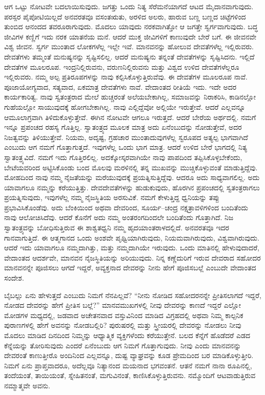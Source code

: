 ಆಗ ಒಟ್ಟು ನೋಟವೇ ಬದಲಾಯಿಸುವುದು. ಜಗತ್ತು ಒಂದು ನಿತ್ಯ ಸೆರೆಮನೆಯಾಗದೆ ಆಟದ ಮೈದಾನವಾಗುವುದು. ಪರಸ್ಪರ ಪೈಪೋಟಿಯಿಲ್ಲದೆ ಅನವರತವೂ ವಸಂತಋತು, ಅರಳಿದ ಅಲರು, ಹಾರುವ ಬಣ್ಣ ಬಣ್ಣದ ಚಿಟ್ಟೆಗಳಿಂದ ತುಂಬಿದ ಆನಂದದ ತವರೂರಾಗುವುದು. ಮೊದಲು ಯಾವುದು ನರಕವಾಗಿತ್ತೋ ಆ ಜಗತ್ತೇ ಸ್ವರ್ಗವಾಗುವುದು. ಬದ್ಧ ಜೀವಿಗಳ ಕಣ್ಣಿಗೆ ಇದು ನರಕ ಯಾತನೆಯ ಮನೆ. ಆದರೆ ಮುಕ್ತ ಜೀವಿಗಳಿಗೆ ಕಾಣುವುದೇ ಬೇರೆ ಬಗೆ. ಈ ಜೀವನವೇ ವಿಶ್ವ ಜೀವನ. ಸ್ವರ್ಗ ಮುಂತಾದ ಲೋಕಗಳೆಲ್ಲ ಇಲ್ಲೇ ಇವೆ. ಮಾನವನನ್ನು ಹೋಲುವ ದೇವತೆಗಳೆಲ್ಲ ಇಲ್ಲಿರುವರು. ದೇವತೆಗಳು ತಮ್ಮಂತೆ ಮನುಷ್ಯನನ್ನು ಸೃಷ್ಟಿಸಲಿಲ್ಲ. ಆದರೆ ಮನುಷ್ಯನು ತನ್ನಂತೆ ದೇವತೆಗಳನ್ನು ಸೃಷ್ಟಿಸಿದನು. ಇಲ್ಲಿದೆ ದೇವತೆಗಳ ಮೂಲರೂಪ. ಇಂದ್ರನಿಲ್ಲಿರುವನು, ವರುಣನಿಲ್ಲಿರುವನು ಮತ್ತು ವಿಶ್ವದ ಉಳಿದ ದೇವತೆಗಳೆಲ್ಲರೂ ಇಲ್ಲಿರುವರು. ನಮ್ಮ ಅಲ್ಪ ಪ್ರತಿರೂಪಗಳನ್ನು ನಾವು ಕಲ್ಪಿಸಿಕೊಳ್ಳುತ್ತಿರುವೆವು. ಈ ದೇವತೆಗಳ ಮೂಲರೂಪ ನಾವೆ. ಪೂಜಾಯೋಗ್ಯವಾದ, ಸತ್ಯವಾದ, ಏಕಮಾತ್ರ ದೇವತೆಗಳು ನಾವೆ. ವೇದಾಂತದ ರೀತಿಯೆ ಇದು. ಇದೇ ಅದರ ಕಾರ್ಯಕಾರಿತ್ವ. ನಾವು ಸ್ವತಂತ್ರರಾದ ಮೇಲೆ ಹುಚ್ಚರಂತೆ ಅಲೆಯಬೇಕಾಗಿಲ್ಲ, ಸಮಾಜವನ್ನು ನಿರಾಕರಿಸಿ, ಕಾಡಿನಲ್ಲೋ ಗುಹೆಯಲ್ಲೋ ಸಾಯುವುದಕ್ಕೆ ಹೋಗಬೇಕಾಗಿಲ್ಲ. ನಾವು ಎಲ್ಲಿದ್ದೆವೋ ಅಲ್ಲಿಯೇ ಇರುತ್ತೇವೆ. ಆದರೆ ಎಲ್ಲವನ್ನೂ ಆಮೂಲಾಗ್ರವಾಗಿ ತಿಳಿದುಕೊಳ್ಳುತ್ತೇವೆ. ಈಗಿನ ನೋಟವೇ ಆಗಲೂ ಇರುತ್ತದೆ. ಆದರೆ ಬೇರೆಯ ಅರ್ಥದಲ್ಲಿ. ನಮಗೆ ಇನ್ನೂ ಪ್ರಪಂಚದ ರಹಸ್ಯ ಗೊತ್ತಿಲ್ಲ. ಸ್ವಾತಂತ್ರ್ಯದ ಮೂಲಕ ಮಾತ್ರ ಅದು ಏನೆಂಬುದನ್ನು ನೋಡುತ್ತೇವೆ, ಅದರ ನಿಜತ್ವವನ್ನು ತಿಳಿಯುತ್ತೇವೆ. ನಿಯಮ, ಅದೃಷ್ಟ, ಗ್ರಹಚಾರ ಮುಂತಾದುವುಗಳೆಲ್ಲ ಸ್ವರೂಪದ ಅತ್ಯಲ್ಪ ಭಾಗವಾಗಿದೆ ಎಂಬುದು ಆಗ ನಮಗೆ ಗೊತ್ತಾಗುತ್ತದೆ. ಇವುಗಳೆಲ್ಲ ಒಂದು ಭಾಗ ಮಾತ್ರ. ಆದರೆ ಉಳಿದ ಬೇರೆ ಭಾಗದಲ್ಲಿ ನಿತ್ಯ ಸ್ವಾತಂತ್ರ್ಯವಿದೆ. ನಮಗೆ ಇದು ಗೊತ್ತಿರಲಿಲ್ಲ. ಅದಕ್ಕೋಸ್ಕರವಾಗಿಯೇ ನಾವು ಪಾಪದಿಂದ ತಪ್ಪಿಸಿಕೊಳ್ಳಬೇಕೆಂದು, ಬೇಟೆಯವರಿಂದ ಅಟ್ಟಿಸಿಕೊಂಡು ಬಂದ ಮೊಲವು ಮರಳಿನಲ್ಲಿ ತನ್ನ ಮುಖವನ್ನು ಮುಚ್ಚಿಕೊಳ್ಳುವಂತೆ ಮಾಡುತ್ತಿದ್ದೆವು. ಮೋಹದಿಂದ ನಾವು ನಮ್ಮ ನೈಜತೆಯನ್ನು ಮರೆಯುವುದಕ್ಕೆ ಪ್ರಯತ್ನಿಸುತ್ತಿದ್ದೆವು. ಆದರೂ ಅದು ಸಾಧ್ಯವಾಗಲಿಲ್ಲ. ಅದು ಯಾವಾಗಲೂ ನಮ್ಮನ್ನು ಕರೆಯುತ್ತಿತ್ತು. ದೇವದೇವತೆಗಳನ್ನು ಹುಡುಕುವುದು, ಹೊರಗಿನ ಪ್ರಪಂಚದಲ್ಲಿ ಸ್ವತಂತ್ರರಾಗಲು ಪ್ರಯತ್ನಿಸುವುದು, ಇವುಗಳೆಲ್ಲ ನಮ್ಮ ನೈಜಸ್ಥಿತಿಯ ಅರಸುವಿಕೆ. ನಮಗೆ ಕೇಳುತ್ತಿದ್ದ ಧ್ವನಿಯನ್ನು ತಪ್ಪು ಪ್ರಭಾವಿಸಿಕೊಂಡೆವು. ಅದು ಬೆಂಕಿಯಿಂದ ಅಥವಾ ದೇವರಿಂದ, ಸೂರ್ಯ–ಚಂದ್ರ ನಕ್ಷತ್ರಾವಳಿಗಳಿಂದ ಬಂದಿತೆಂದು ನಾವು ಆಲೋಚಿಸಿದೆವು. ಆದರೆ ಕೊನೆಗೆ ಅದು ನಮ್ಮ ಅಂತರಂಗದಿಂದಲೇ ಬಂದಿತೆಂದು ಗೊತ್ತಾಗಿದೆ. ನಿಜ ಸ್ವಾತಂತ್ರ್ಯವನ್ನು ಬೋಧಿಸುತ್ತಿರುವ ಈ ಶಾಶ್ವತಧ್ವನಿ ನಮ್ಮ ಹೃದಯಾಂತರಾಳದಲ್ಲಿದೆ. ಅನವರತವೂ ಇದರ ಗಾನವಾಗುತ್ತಿದೆ. ಈ ಆತ್ಮಗಾನದ ಒಂದು ಅಂಶವೇ ಪೃಥ್ವಿಯಾಗಿರುವುದು, ನಿಯಮವಾಗಿರುವುದು, ವಿಶ್ವವಾಗಿರುವುದು. ಆದರೆ ಇದು ಯಾವಾಗಲೂ ನಮ್ಮದಾಗಿತ್ತು, ಮತ್ತು ನಮ್ಮದಾಗಿಯೇ ಇರುವುದು. ಒಂದು ಮಾತಿನಲ್ಲಿ ಹೇಳುವುದಾದರೆ, ವೇದಾಂತದ ಆದರ್ಶವೇ, ಮಾನವನ ನೈಜಸ್ಥಿತಿಯನ್ನು ಅರಿಯುವುದು. ನಿನ್ನ ಕಣ್ಣೆದುರಿಗೆ ಇರುವ ದೇವರಾದ ಸಹೋದರ ಮಾನವನನ್ನೇ ಪೂಜಿಸಲು ಆಗದೆ ಇದ್ದರೆ, ಅವ್ಯಕ್ತನಾದ ದೇವರನ್ನು ನೀನು ಹೇಗೆ ಪೂಜಿಸಬಲ್ಲೆ ಎಂಬುದೇ ವೇದಾಂತದ ಸಂದೇಶ. 

\vskip 5pt

ಬೈಬಲ್ಲು ಏನು ಹೇಳುತ್ತದೆ ಎಂಬುದು ನಿಮಗೆ ನೆನಪಿಲ್ಲವೆ? “ನೀನು ನೋಡಿದ ಸಹೋದರನನ್ನೇ ಪ್ರೀತಿಸಲಾಗದೆ ಇದ್ದರೆ, ನೋಡದ ದೇವರನ್ನು ಹೇಗೆ ಪ್ರೀತಿಸ ಬಲ್ಲೆ?” ಮಾನವಮುಖಗಳಲ್ಲಿ ನೀವು ದೇವರನ್ನು ಕಾಣದೆ ಇದ್ದರೆ ಎಲ್ಲೋ ಮೋಡಗಳ ಮಧ್ಯದಲ್ಲಿ, ಜಡವಾದ ಅಚೇತನವಾದ ವಸ್ತುವಿನಿಂದ ಮಾಡಿದ ವಿಗ್ರಹದಲ್ಲಿ ಅಥವಾ ನಿಮ್ಮ ಕಾಲ್ಪನಿಕ ಪುರಾಣಗಳಲ್ಲಿ ಹೇಗೆ ಅವನನ್ನು ನೋಡಬಲ್ಲಿರಿ? ಪುರುಷರಲ್ಲಿ ಮತ್ತು ಸ್ತ್ರೀಯರಲ್ಲಿ ದೇವರನ್ನು ನೋಡಲು ನೀವು ಮೊದಲು ಮಾಡಿದ ದಿನದಿಂದ ನಿಮ್ಮನ್ನು ಆಧ್ಯಾತ್ಮಿಕ ವ್ಯಕ್ತಿಗಳೆಂದು ಕರೆಯುತ್ತೇನೆ. ಬಲದ ಕೆನ್ನೆಗೆ ಹೊಡೆದರೆ ಎಡದ ಕೆನ್ನೆಯನ್ನು ತೋರಿಸುವುದು ಎಂದರೆ ಏನೆಂಬುದು ಆಗ ನಿಮಗೆ ಗೊತ್ತಾಗುವುದು. ನೀವು ಎಂದು ಮಾನವನನ್ನು ದೇವರಂತೆ ಕಾಣುತ್ತೀರೊ ಅಂದಿನಿಂದ ಎಲ್ಲವನ್ನೂ, ದುಷ್ಟ ವ್ಯಾಘ್ರವನ್ನು ಕೂಡ ಪ್ರೇಮದಿಂದ ಬರ ಮಾಡಿಕೊಳ್ಳುತ್ತೀರಿ. ನಿಮಗೆ ಏನು ಪ್ರಾಪ್ತವಾದರೂ, ಅದೆಲ್ಲವೂ ನಿತ್ಯಾನಂದ ಮಯನಾದ ಭಗವಂತನೆ. ಆತನೆ ನಮಗೆ ನಾನಾ ರೂಪಿನಲ್ಲಿ, ತಂದೆಯಂತೆ, ತಾಯಿಯಂತೆ, ಸ್ನೇಹಿತನಂತೆ, ಮಗುವಿನಂತೆ, ಕಾಣಿಸಿಕೊಳ್ಳುತ್ತಿರುವನು. ನಮ್ಮೊಂದಿಗೆ ಆಟವಾಡುತ್ತಿರುವ ನಮ್ಮಾತ್ಮವೇ ಅವನು. 

